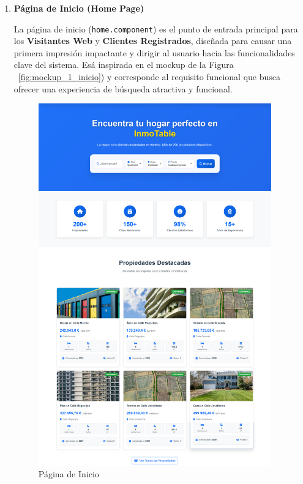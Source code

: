\begin{enumerate}
    \item \textbf{Página de Inicio (Home Page)}

    La página de inicio (\texttt{home.component}) es el punto de entrada principal para los \textbf{Visitantes Web} y \textbf{Clientes Registrados}, diseñada para causar una primera impresión impactante y dirigir al usuario hacia las funcionalidades clave del sistema. Esá inspirada en el mockup de la Figura ~\ref{fig:mockup_1_inicio}) y corresponde al requisito funcional que busca ofrecer una experiencia de búsqueda atractiva y funcional.

    \begin{figure}[H]
        \begin{center}
            \includegraphics[width = 0.95\textwidth]{Figuras/inicio.png}
        \end{center}
        \caption{\label{fig:inicio} Página de Inicio}
    \end{figure}


\end{enumerate}
